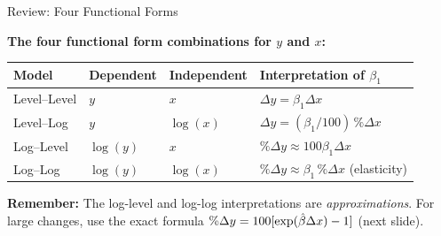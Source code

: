 \documentclass[aspectratio=169, 12pt]{beamer}
\begin{document}
\begin{frame}[shrink=8]{Review: Four Functional Forms}

  \begin{highlightbox}
    \textbf{The four functional form combinations for $y$ and $x$:}
  \end{highlightbox}

  \medskip

  \begin{tabular}{llll}
    \toprule
    \textbf{Model} & \textbf{Dependent} & \textbf{Independent} & \textbf{Interpretation of $\beta_1$} \\
    \midrule
    Level--Level & $y$        & $x$        & $\Delta y = \beta_1 \Delta x$ \\[3pt]
    Level--Log   & $y$        & $\log(x)$  & $\Delta y = (\beta_1/100)\, \%\Delta x$ \\[3pt]
    Log--Level   & $\log(y)$  & $x$        & $\%\Delta y \approx 100\beta_1 \Delta x$ \\[3pt]
    Log--Log     & $\log(y)$  & $\log(x)$  & $\%\Delta y \approx \beta_1\, \%\Delta x$ (elasticity) \\
    \bottomrule
  \end{tabular}

  \medskip

  \begin{keybox}
    \textbf{Remember:} The log-level and log-log interpretations are
    \emph{approximations}. For large changes, use the exact formula
    $\%\Delta y = 100[\exp(\hat{\beta} \Delta x) - 1]$ (next slide).
  \end{keybox}

\end{frame}
\end{document}
